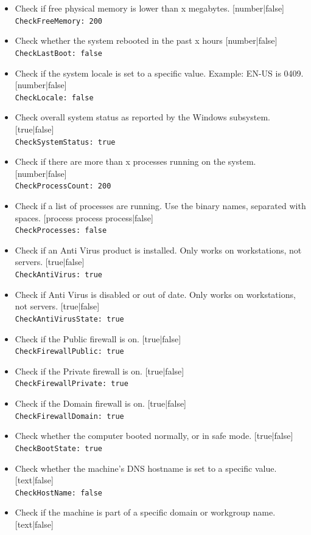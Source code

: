 \documentclass[11pt]{article}
\begin{document}
\begin{itemize}
\item Check if free physical memory is lower than x megabytes. [number|false]\\
\texttt{CheckFreeMemory: 200}
\item Check whether the system rebooted in the past x hours [number|false]\\
\texttt{CheckLastBoot: false}
\item Check if the system locale is set to a specific value. Example: EN-US is 0409. [number|false]\\
\texttt{CheckLocale: false}
\item Check overall system status as reported by the Windows subsystem. [true|false]\\
\texttt{CheckSystemStatus: true}
\item Check if there are more than x processes running on the system. [number|false]\\
\texttt{CheckProcessCount: 200}
\item Check if a list of processes are running. Use the binary names, separated with spaces. [process process process|false]\\
\texttt{CheckProcesses: false}
\item Check if an Anti Virus product is installed. Only works on workstations, not servers. [true|false]\\
\texttt{CheckAntiVirus: true}
\item Check if Anti Virus is disabled or out of date. Only works on workstations, not servers. [true|false]\\
\texttt{CheckAntiVirusState: true}
\item Check if the Public firewall is on. [true|false]\\
\texttt{CheckFirewallPublic: true}
\item Check if the Private firewall is on. [true|false]\\
\texttt{CheckFirewallPrivate: true}
\item Check if the Domain firewall is on. [true|false]\\
\texttt{CheckFirewallDomain: true}
\item Check whether the computer booted normally, or in safe mode. [true|false]\\
\texttt{CheckBootState: true}
\item Check whether the machine's DNS hostname is set to a specific value. [text|false]\\
\texttt{CheckHostName: false}
\item Check if the machine is part of a specific domain or workgroup name. [text|false]\\

\end{itemize}
\end{document}

